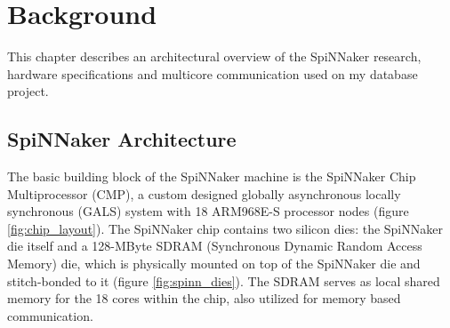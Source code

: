 \chapter{Background}
\label{cha:background}
This chapter describes an architectural overview of the SpiNNaker research, hardware specifications and multicore communication used on my database project.

\section{SpiNNaker Architecture}
\label{sec:spinn_arch}

The basic building block of the SpiNNaker machine is the SpiNNaker Chip Multiprocessor (CMP), a custom designed globally asynchronous locally synchronous (GALS) system with 18 ARM968E-S processor nodes (figure \ref{fig:chip_layout}). \cite{painkras}
The SpiNNaker chip contains two silicon dies: the SpiNNaker die itself and a 128-MByte SDRAM (Synchronous Dynamic Random Access Memory) die, which is physically mounted on top of the SpiNNaker die and stitch-bonded to it (figure \ref{fig:spinn_dies}). \cite{spinnchip} The SDRAM serves as local shared memory for the 18 cores within the chip, also utilized for memory based communication. \cite{datasheet}

